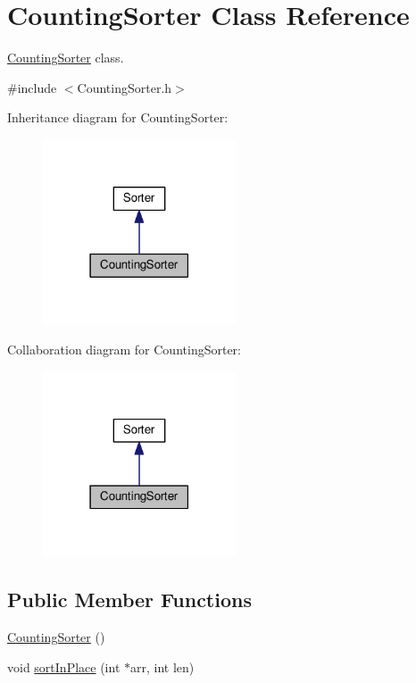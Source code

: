 \hypertarget{class_counting_sorter}{}\section{Counting\+Sorter Class Reference}
\label{class_counting_sorter}


\hyperlink{class_counting_sorter}{Counting\+Sorter} class.  




{\ttfamily \#include $<$Counting\+Sorter.\+h$>$}



Inheritance diagram for Counting\+Sorter\+:\nopagebreak
\begin{figure}[H]
\begin{center}
\leavevmode
\includegraphics[width=162pt]{class_counting_sorter__inherit__graph}
\end{center}
\end{figure}


Collaboration diagram for Counting\+Sorter\+:\nopagebreak
\begin{figure}[H]
\begin{center}
\leavevmode
\includegraphics[width=162pt]{class_counting_sorter__coll__graph}
\end{center}
\end{figure}
\subsection*{Public Member Functions}
\begin{DoxyCompactItemize}
\item 
\hyperlink{class_counting_sorter_ad59c68b3b3190319c49a595b1cba86b7}{Counting\+Sorter} ()
\item 
void \hyperlink{class_counting_sorter_adcfc7504df3cd6e0f398a3f064bc01bc}{sort\+In\+Place} (int $\ast$arr, int len)
\end{DoxyCompactItemize}

